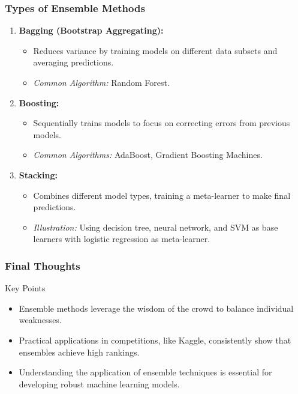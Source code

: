 \documentclass[aspectratio=169]{beamer}
\begin{document}
\begin{frame}[fragile]
    \frametitle{Types of Ensemble Methods}
    \begin{enumerate}
        \item \textbf{Bagging (Bootstrap Aggregating):}
            \begin{itemize}
                \item Reduces variance by training models on different data subsets and averaging predictions.
                \item \textit{Common Algorithm:} Random Forest.
            \end{itemize}
        \item \textbf{Boosting:}
            \begin{itemize}
                \item Sequentially trains models to focus on correcting errors from previous models.
                \item \textit{Common Algorithms:} AdaBoost, Gradient Boosting Machines.
            \end{itemize}
        \item \textbf{Stacking:}
            \begin{itemize}
                \item Combines different model types, training a meta-learner to make final predictions.
                \item \textit{Illustration:} Using decision tree, neural network, and SVM as base learners with logistic regression as meta-learner.
            \end{itemize}
    \end{enumerate}
\end{frame}

\begin{frame}[fragile]
    \frametitle{Final Thoughts}
    \begin{block}{Key Points}
        \begin{itemize}
            \item Ensemble methods leverage the wisdom of the crowd to balance individual weaknesses.
            \item Practical applications in competitions, like Kaggle, consistently show that ensembles achieve high rankings.
            \item Understanding the application of ensemble techniques is essential for developing robust machine learning models.
        \end{itemize}
    \end{block}
\end{frame}
\end{document}
